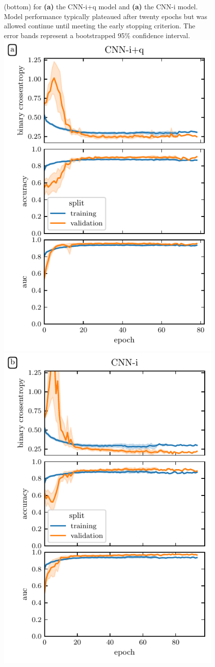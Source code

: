 \documentclass[fleqn,10pt,inline]{wlscirep}
\begin{document}
\begin{figure}[tbp]
{        (bottom) for \textbf{(a)} the CNN-i+q model and \textbf{(a)} the CNN-i
        model. Model performance typically plateaued after twenty epochs but was
        allowed continue until meeting the early stopping criterion. The error
        bands represent a bootstrapped 95\% confidence interval.
    }{%
        \hfill
        \includegraphics[width=0.45\linewidth]{deep-learning-qc/dl_learning_curve_with_qc.pdf}
        \hfill
        \includegraphics[width=0.45\linewidth]{deep-learning-qc/dl_learning_curve_without_qc.pdf}
        \hfill
    }\label{figsupp:dl-loss}
\end{figure}
\end{document}
